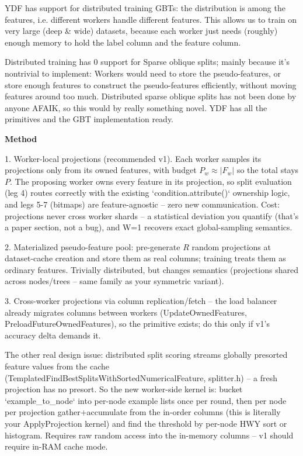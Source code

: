 \documentclass[sigconf]{acmart}
\begin{document}
YDF has support for distributed training GBTs: the distribution is among the features, i.e. different workers handle different features. This allows us to train on very large (deep \& wide) datasets, because each worker just needs (roughly) enough memory to hold the label column and the feature column. 


Distributed training has 0 support for Sparse oblique splits; mainly because it's nontrivial to implement: Workers would need to store the pseudo-features, or store enough features to construct the pseudo-features efficiently, without moving features around too much. 
Distributed sparse oblique splits has not been done by anyone AFAIK, so this would by really something novel. YDF has all the primitives and the GBT implementation ready.


\textbf{Method}

1. Worker-local projections (recommended v1). Each worker samples its projections only from its owned features, with budget $P_w \approx |F_w|$ so the total stays $P$. The proposing worker owns every feature in its projection, so split evaluation (leg 4) routes correctly with the existing `condition.attribute()` ownership logic, and legs 5-7 (bitmaps) are feature-agnostic -- zero new communication. Cost: projections never cross worker shards -- a statistical deviation you quantify (that's a paper section, not a bug), and W=1 recovers exact global-sampling semantics.

2. Materialized pseudo-feature pool: pre-generate $R$ random projections at dataset-cache creation and store them as real columns; training treats them as ordinary features. Trivially distributed, but changes semantics (projections shared across nodes/trees -- same family as your symmetric variant).


3. Cross-worker projections via column replication/fetch -- the load balancer already migrates columns between workers (UpdateOwnedFeatures, PreloadFutureOwnedFeatures), so the primitive exists; do this only if v1's accuracy delta demands it.

The other real design issue: distributed split scoring streams globally presorted feature values from the cache (TemplatedFindBestSplitsWithSortedNumericalFeature, splitter.h) -- a fresh projection has no presort. So the new worker-side kernel is: bucket `example\_to\_node` into per-node example lists once per round, then per node per projection gather+accumulate from the in-order columns (this is literally your ApplyProjection kernel) and find the threshold by per-node HWY sort or histogram. Requires raw random access into the in-memory columns -- v1 should require in-RAM cache mode.
\end{document}
